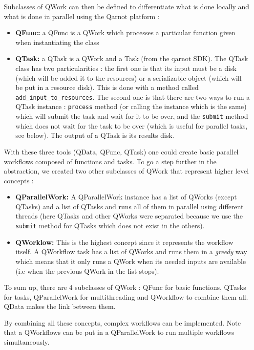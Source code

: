 \documentclass[10pt, conference, compsocconf]{IEEEtran}
\begin{document}
Subclasses of QWork can then be defined to differentiate what is done locally and what is done in parallel using the Qarnot platform : 
\begin{itemize}
\item \textbf{QFunc:} a QFunc is a QWork which processes a particular function given when instantiating the class
\item \textbf{QTask:} a QTask is a QWork and a Task (from the qarnot SDK). The QTask class has two particularities : 
the first one is that its input must be a disk (which will be added it to the resources) or a serializable object (which will be put in a resource disk). This is done with a method called \texttt{add\_input\_to\_resources}. The second one is that there are two ways to run a QTask instance : \texttt{process} method (or calling the instance which is the same) which will submit the task and wait for it to be over, and the \texttt{submit} method which does not wait for the task to be over (which is useful for parallel tasks, see below). The output of a QTask is its results disk.
\end{itemize}
With these three tools (QData, QFunc, QTask) one could create basic parallel workflows composed of functions and tasks. To go a step further in the abstraction, we created two other subclasses of QWork that represent higher level concepts : 
\begin{itemize}
\item \textbf{QParallelWork:} A QParallelWork instance has a list of QWorks (except QTasks) and a list of QTasks and runs all of them in parallel using different threads (here QTasks and other QWorks were separated because we use the \texttt{submit} method for QTasks which does not exist in the others).
\item \textbf{QWorklow:} This is the highest concept since it represents the workflow itself. A QWorkflow task has a list of QWorks and runs them in a {\it greedy} way which means that it only runs a QWork when its needed inputs are available (i.e when the previous QWork in the list stops).
\end{itemize}
To sum up, there are 4 subclasses of QWork : QFunc for basic functions, QTasks for tasks, QParallelWork for multithreading and QWorkflow to combine them all. QData makes the link between them.

By combining all these concepts, complex workflows can be implemented. Note that a QWorkflows can be put in a QParallelWork to run multiple workflows simultaneously. 
\end{document}
